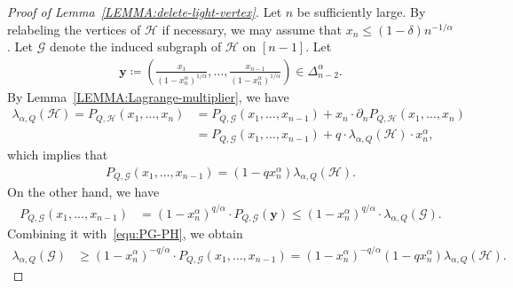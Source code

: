 \documentclass[11pt,a4paper]{article}
\begin{document}
\begin{proof}[Proof of Lemma~\ref{LEMMA:delete-light-vertex}]
    Let $n$ be sufficiently large. 
    By relabeling the vertices of $\mathcal{H}$ if necessary, we may assume that $x_n \le (1-\delta) n^{-1/\alpha}$. 
    Let $\mathcal{G}$ denote the induced subgraph of $\mathcal{H}$ on $[n-1]$. 
    Let %
    \begin{align*}
        \mathbf{y} 
        \coloneqq  \left(\frac{x_1}{\left(1-x_n^{\alpha}\right)^{1/\alpha}}, \ldots, \frac{x_{n-1}}{\left(1-x_n^{\alpha}\right)^{1/\alpha}} \right) 
        \in \Delta_{n-2}^{\alpha}. 
    \end{align*}
    By Lemma~\ref{LEMMA:Lagrange-multiplier}, we have 
    \begin{align*}
        \lambda_{\alpha, Q}(\mathcal{H})
        = P_{Q,\mathcal{H}}(x_1, \ldots, x_n)
        & = P_{Q,\mathcal{G}}(x_1, \ldots, x_{n-1}) + x_{n} \cdot \partial_{n}P_{Q,\mathcal{H}}(x_1, \ldots, x_n) \\
        & = P_{Q,\mathcal{G}}(x_1, \ldots, x_{n-1}) + q \cdot \lambda_{\alpha,Q}(\mathcal{H}) \cdot x_{n}^{\alpha}, 
    \end{align*}
    which implies that 
    \begin{align}\label{equ:PG-PH}
        P_{Q,\mathcal{G}}(x_1, \ldots, x_{n-1})
        = \left( 1- q x_{n}^{\alpha} \right) \lambda_{\alpha, Q}(\mathcal{H}). 
    \end{align}
    On the other hand, we have 
    \begin{align*}
        P_{Q,\mathcal{G}}(x_1, \ldots, x_{n-1})
        & = \left(1-x_n^{\alpha}\right)^{q/\alpha} \cdot P_{Q,\mathcal{G}}\left(\mathbf{y}\right)
        \le \left(1-x_n^{\alpha}\right)^{q/\alpha} \cdot \lambda_{\alpha, Q}(\mathcal{G}).
    \end{align*}
    Combining it with~\eqref{equ:PG-PH}, we obtain 
    \begin{align*}
        \lambda_{\alpha, Q}(\mathcal{G})
        & \ge \left(1-x_n^{\alpha}\right)^{-q/\alpha} \cdot P_{Q,\mathcal{G}}(x_1, \ldots, x_{n-1}) 
        = \left(1-x_n^{\alpha}\right)^{-q/\alpha} \left( 1- q x_{n}^{\alpha} \right) \lambda_{\alpha, Q}(\mathcal{H}). 
    \end{align*}


\end{proof}
\end{document}
